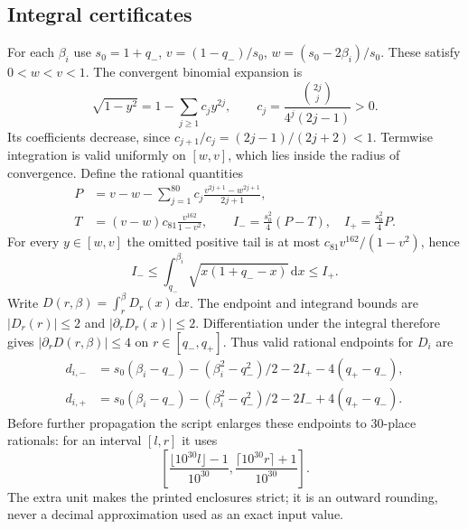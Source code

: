 \documentclass[11pt,a4paper]{article}
\theoremstyle{remark}\newtheorem{remark}[theorem]{Remark}
\newcommand{\dd}{\,\mathrm d}
\begin{document}
\subsection{Integral certificates}
For each $\beta_i$ use $s_0=1+q_-$,
$v=(1-q_-)/s_0$, $w=(s_0-2\beta_i)/s_0$. These satisfy $0<w<v<1$.
The convergent binomial expansion is
\[
\sqrt{1-y^2}=1-\sum_{j\ge1}c_jy^{2j},\qquad
c_j=\frac{\binom{2j}{j}}{4^j(2j-1)}>0.
\]
Its coefficients decrease, since $c_{j+1}/c_j=(2j-1)/(2j+2)<1$.
Termwise integration is valid uniformly on $[w,v]$, which lies inside
the radius of convergence. Define the rational quantities
\begin{align*}
P&=v-w-\sum_{j=1}^{80}c_j\frac{v^{2j+1}-w^{2j+1}}{2j+1},\\
T&=(v-w)c_{81}\frac{v^{162}}{1-v^2},\qquad
I_-=\frac{s_0^2}{4}(P-T),\quad I_+=\frac{s_0^2}{4}P.
\end{align*}
For every $y\in[w,v]$ the omitted positive tail is at most
$c_{81}v^{162}/(1-v^2)$, hence
\[
I_-\le\int_{q_-}^{\beta_i}\sqrt{x(1+q_--x)}\dd x\le I_+.
\]
Write $D(r,\beta)=\int_r^\beta D_r(x)\dd x$. The endpoint and
integrand bounds are $|D_r(r)|\le2$ and $|\partial_rD_r(x)|\le2$.
Differentiation under the integral therefore gives
$|\partial_rD(r,\beta)|\le4$ on $r\in[q_-,q_+]$.
Thus valid rational endpoints for $D_i$ are
\begin{align*}
d_{i,-}&=s_0(\beta_i-q_-)-(\beta_i^2-q_-^2)/2-2I_+-4(q_+-q_-),\\
d_{i,+}&=s_0(\beta_i-q_-)-(\beta_i^2-q_-^2)/2-2I_-+4(q_+-q_-).
\end{align*}
Before further propagation the script enlarges these endpoints to
30-place rationals: for an interval $[l,r]$ it uses
\[
\left[\frac{\lfloor10^{30}l\rfloor-1}{10^{30}},
\frac{\lceil10^{30}r\rceil+1}{10^{30}}\right].
\]
The extra unit makes the printed enclosures strict; it is an outward
rounding, never a decimal approximation used as an exact input value.
\end{document}
